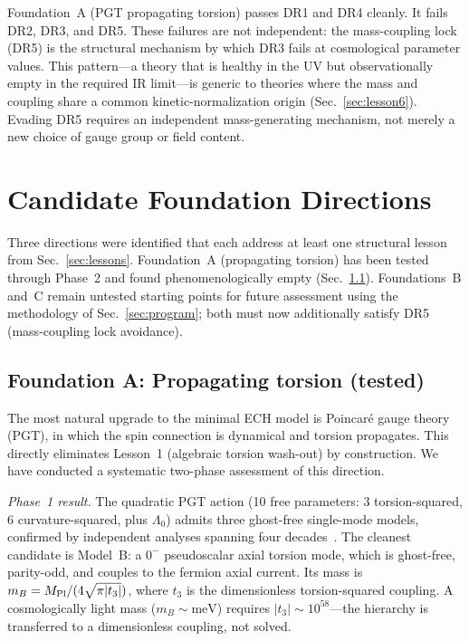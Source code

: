 \documentclass[aps,prd,twocolumn,superscriptaddress,showpacs,preprintnumbers,
  nofootinbib,longbibliography,floatfix]{revtex4-2}
\newcommand{\MPl}{M_{\rm Pl}}
\begin{document}
\noindent
Foundation~A (PGT propagating torsion) passes DR1 and DR4 cleanly. It
fails DR2, DR3, and DR5. These failures are not independent: the
mass-coupling lock (DR5) is the structural mechanism by which DR3 fails
at cosmological parameter values. This pattern---a theory that is
healthy in the UV but observationally empty in the required IR
limit---is generic to theories where the mass and coupling share a
common kinetic-normalization origin (Sec.~\ref{sec:lesson6}). Evading
DR5 requires an independent mass-generating mechanism, not merely a
new choice of gauge group or field content.


\section{Candidate Foundation Directions}\label{sec:candidates}

Three directions were identified that each address at least one
structural lesson from Sec.~\ref{sec:lessons}. Foundation~A (propagating
torsion) has been tested through Phase~2 and found phenomenologically
empty (Sec.~\ref{sec:foundA}). Foundations~B and~C remain untested
starting points for future assessment using the methodology of
Sec.~\ref{sec:program}; both must now additionally satisfy DR5
(mass-coupling lock avoidance).

\subsection{Foundation A: Propagating torsion (tested)}\label{sec:foundA}

The most natural upgrade to the minimal ECH model is Poincar\'e gauge
theory (PGT), in which the spin connection is dynamical and torsion
propagates. This directly eliminates Lesson~1 (algebraic torsion wash-out)
by construction. We have conducted a systematic two-phase assessment of
this direction.

\textit{Phase~1 result.}
The quadratic PGT action (10 free parameters: 3 torsion-squared, 6
curvature-squared, plus $\Lambda_0$) admits three ghost-free single-mode
models, confirmed by independent analyses spanning four
decades~\cite{SezginNieuwenhuizen1980,Karananas2015}. The cleanest
candidate is Model~B: a $0^-$ pseudoscalar axial torsion mode, which
is ghost-free, parity-odd, and couples to the fermion axial current. Its
mass is $m_B = \MPl/(4\sqrt{\pi|t_3|})$, where $t_3$ is the
dimensionless torsion-squared coupling. A cosmologically light mass
($m_B \sim \text{meV}$) requires $|t_3|\sim 10^{58}$---the hierarchy is
transferred to a dimensionless coupling, not solved.
\end{document}
